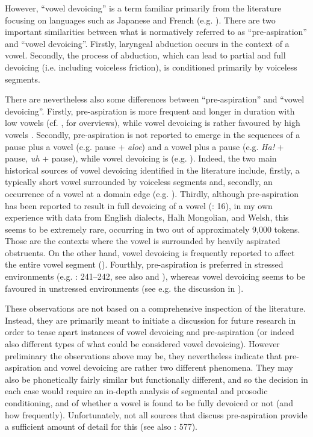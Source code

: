 \documentclass[output=paper]{langscibook}
\begin{document}
However, “vowel devoicing” is a term familiar primarily from the literature focusing on languages such as Japanese and French (e.g. \citealt{Tsuchida2001, Smith2003}). There are two important similarities between what is normatively referred to as “pre-aspiration” and “vowel devoicing”. Firstly, laryngeal abduction occurs in the context of a vowel. Secondly, the process of abduction, which can lead to partial and full devoicing (i.e. including voiceless friction), is conditioned primarily by voiceless segments.

There are nevertheless also some differences between “pre-aspiration” and “vowel devoicing”. Firstly, pre\hyp aspiration is more frequent and longer in duration with low vowels (cf. \cites[107--108]{Hejná2015}[17]{MorrisHejná2020}, for overviews), while vowel devoicing is rather favoured by high vowels \citep[65]{Ohala2011}. Secondly, pre\hyp aspiration is not reported to emerge in the sequences of a pause plus a vowel (e.g. pause + \textit{aloe}) and a vowel plus a pause (e.g. \textit{Ha!} + pause, \textit{uh} + pause), while vowel devoicing is (e.g. \cites[193]{Smith2003}{Tsuchida2001}). Indeed, the two main historical sources of vowel devoicing identified in the literature include, firstly, a typically short vowel surrounded by voiceless segments and, secondly, an occurrence of a vowel at a domain edge (e.g. \cites[199]{Blevins2004}{Kuznetsova2015}). Thirdly, although pre\hyp aspiration has been reported to result in full devoicing of a vowel (\citealt{JatteauHejná2016}: 16), in my own experience with data from English dialects, Halh Mongolian, and Welsh, this seems to be extremely rare, occurring in two out of approximately 9,000 tokens. Those are the contexts where the vowel is surrounded by heavily aspirated obstruents. On the other hand, vowel devoicing is frequently reported to affect the entire vowel segment (\cites[1--2]{OberlyKharlamov2015}{KuznetsovaVerkhodanova2019}). Fourthly, pre\hyp aspiration is preferred in stressed environments (e.g. \citealt{HejnáJespersen2019}: 241--242, see also  and ), whereas vowel devoicing seems to be favoured in unstressed environments (see e.g. the discussion in \citealt{Smith2003}). 

These observations are not based on a comprehensive inspection of the literature. Instead, they are primarily meant to initiate a discussion for future research in order to tease apart instances of vowel devoicing and pre\hyp aspiration (or indeed also different types of what could be considered vowel devoicing). However preliminary the observations above may be, they nevertheless indicate that pre\hyp aspiration and vowel devoicing are rather two different phenomena. They may also be phonetically fairly similar but functionally different, and so the decision in each case would require an in-depth analysis of segmental and prosodic conditioning, and of whether a vowel is found to be fully devoiced or not (and how frequently). Unfortunately, not all sources that discuss pre\hyp aspiration provide a sufficient amount of detail for this (see also \citealt{Silverman2003}: 577).
\end{document}
